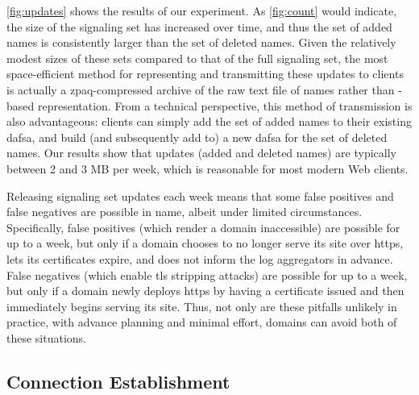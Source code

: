 \autoref{fig:updates} shows the results of our experiment. As
\autoref{fig:count} would indicate, the size of the signaling set has increased
over time, and thus the set of added names is consistently larger than the set
of deleted names. Given the relatively modest sizes of these sets compared to
that of the full signaling set, the most space-efficient method for representing
and transmitting these updates to clients is actually a zpaq-compressed archive
of the raw text file of names rather than -based representation. From
a technical perspective, this method of transmission is also advantageous:
clients can simply add the set of added names to their existing \ac{dafsa}, and
build (and subsequently add to) a new \ac{dafsa} for the set of deleted names.
Our results show that updates (added and deleted names) are typically between 2
and 3 MB per week, which is reasonable for most modern Web clients.

Releasing signaling set updates each week means that some false positives and
false negatives are possible in \ac{name}, albeit under limited circumstances.
Specifically, false positives (which render a domain inaccessible) are possible
for up to a week, but only if a domain chooses to no longer serve its site over
\ac{https}, lets its certificates expire, and does not inform the log
aggregators in advance. False negatives (which enable \ac{tls} stripping
attacks) are possible for up to a week, but only if a domain newly deploys
\ac{https} by having a certificate issued and then immediately begins serving
its site. Thus, not only are these pitfalls unlikely in practice, with advance
planning and minimal effort, domains can avoid both of these situations.

\subsection{Connection Establishment}
\label{sec:evaluation:performance}

